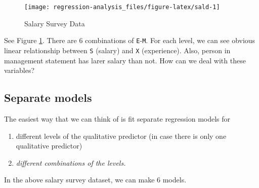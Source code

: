 \documentclass[]{book}
\providecommand{\tightlist}{%
  \setlength{\itemsep}{0pt}\setlength{\parskip}{0pt}}
\theoremstyle{definition}
\theoremstyle{definition}
\theoremstyle{definition}
\theoremstyle{remark}
\begin{document}
\begin{figure}[H]

{\centering \texttt{[image: regression-analysis\_files/figure-latex/sald-1]} 

}

\caption{Salary Survey Data}\label{fig:sald}
\end{figure}

See Figure \ref{fig:sald}. There are 6 combinations of \texttt{E}-\texttt{M}. For each level, we can see obvious linear relationship between \texttt{S} (salary) and \texttt{X} (experience). Also, person in management statement has larer salary than not. How can we deal with these variables?

\hypertarget{modsep}{%
\subsection{Separate models}\label{modsep}}

The easiest way that we can think of is fit separate regression models for

\begin{enumerate}
\def\labelenumi{\arabic{enumi}.}
\tightlist
\item
  different levels of the qualitative predictor (in case there is only one qualitative predictor)
\item
  \emph{different combinations of the levels.}
\end{enumerate}

In the above salary survey dataset, we can make 6 models.
\end{document}
